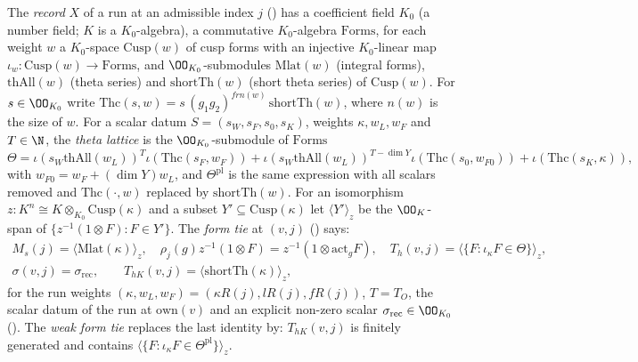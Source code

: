 \begin{definition}\label{pf:onto2:formtie}
The \emph{record} $X$ of a run at an admissible index $j$ () has a coefficient
field $K_0$ (a number field; $K$ is a $K_0$-algebra), a commutative $K_0$-algebra $\mathrm{Forms}$, for each weight $w$ a
$K_0$-space $\mathrm{Cusp}(w)$ of cusp forms with an injective $K_0$-linear map $\iota_w:\mathrm{Cusp}(w)\to\mathrm{Forms}$, and
$\OO_{K_0}$-submodules $\mathrm{Mlat}(w)$ (integral forms), $\mathrm{thAll}(w)$ (theta series) and $\mathrm{shortTh}(w)$ (short theta
series) of $\mathrm{Cusp}(w)$. For $s\in\OO_{K_0}$ write $\mathrm{Thc}(s,w)=s\,(g_1g_2)^{frn(w)}\,\mathrm{shortTh}(w)$, where $n(w)$ is
the size of $w$. For a scalar datum $S=(s_W,s_F,s_0,s_K)$, weights $\kappa,w_L,w_F$ and $T\in\N$, the \emph{theta lattice} is the
$\OO_{K_0}$-submodule of $\mathrm{Forms}$
\[
\Theta=\iota(s_W\mathrm{thAll}(w_L))^{T}\iota(\mathrm{Thc}(s_F,w_F))+\iota(s_W\mathrm{thAll}(w_L))^{T-\dim Y}
\iota(\mathrm{Thc}(s_0,w_{F0}))+\iota(\mathrm{Thc}(s_K,\kappa)),
\]
with $w_{F0}=w_F+(\dim Y)w_L$, and $\Theta^{\mathrm{pl}}$ is the same expression with all scalars removed and $\mathrm{Thc}(\cdot,w)$
replaced by $\mathrm{shortTh}(w)$. For an isomorphism $z:K^n\cong
K\otimes_{K_0}\mathrm{Cusp}(\kappa)$ and a subset $Y'\subseteq\mathrm{Cusp}(\kappa)$ let $\langle Y'\rangle_z$ be the $\OO_K$-span of
$\{z^{-1}(1\otimes F):F\in Y'\}$. The \emph{form tie} at $(v,j)$ () says:
\begin{equation}\label{eq:pf:onto2:formtie}
\begin{gathered}
M_s(j)=\langle\mathrm{Mlat}(\kappa)\rangle_z,\quad \rho_j(g)z^{-1}(1\otimes F)=z^{-1}(1\otimes\mathrm{act}_gF),
\quad T_h(v,j)=\langle\{F:\iota_\kappa F\in\Theta\}\rangle_z,\\
\sigma(v,j)=\sigma_{\mathrm{rec}},\qquad T_{hK}(v,j)=\langle\mathrm{shortTh}(\kappa)\rangle_z ,
\end{gathered}
\end{equation}
for the run weights $(\kappa,w_L,w_F)=(\kappa R(j),lR(j),fR(j))$, $T=T_O$, the scalar datum of the run at $\mathrm{own}(v)$ and an
explicit non-zero scalar $\sigma_{\mathrm{rec}}\in\OO_{K_0}$ (). The \emph{weak form tie}
replaces the last identity by: $T_{hK}(v,j)$ is finitely generated and contains
$\langle\{F:\iota_\kappa F\in\Theta^{\mathrm{pl}}\}\rangle_z$.
\end{definition}


